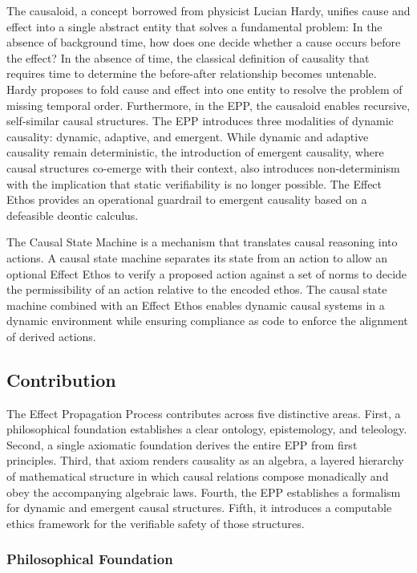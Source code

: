 The causaloid, a concept borrowed from physicist Lucian Hardy, unifies cause and effect into a single abstract entity that solves a fundamental problem: In the absence of background time, how does one decide whether a cause occurs before the effect? In the absence of time, the classical definition of causality that requires time to determine the before-after relationship becomes untenable. Hardy proposes to fold cause and effect into one entity to resolve the problem of missing temporal order. Furthermore, in the EPP, the causaloid enables recursive, self-similar causal structures. The EPP introduces three modalities of dynamic causality: dynamic, adaptive, and emergent. While dynamic and adaptive causality remain deterministic, the introduction of emergent causality, where causal structures co-emerge with their context, also introduces non-determinism with the implication that static verifiability is no longer possible. The Effect Ethos provides an operational guardrail to emergent causality based on a defeasible deontic calculus.

The Causal State Machine is a mechanism that translates causal reasoning into actions. A causal state machine separates its state from an action to allow an optional Effect Ethos to verify a proposed action against a set of norms to decide the permissibility of an action relative to the encoded ethos. The causal state machine combined with an Effect Ethos enables dynamic causal systems in a dynamic environment while ensuring compliance as code to enforce the alignment of derived actions.

\subsection{Contribution}


The Effect Propagation Process contributes across five distinctive areas. First, a philosophical foundation establishes a clear ontology, epistemology, and teleology. Second, a single axiomatic foundation derives the entire EPP from first principles. Third, that axiom renders causality as an algebra, a layered hierarchy of mathematical structure in which causal relations compose monadically and obey the accompanying algebraic laws. Fourth, the EPP establishes a formalism for dynamic and emergent causal structures. Fifth, it introduces a computable ethics framework for the verifiable safety of those structures.

\subsubsection{Philosophical Foundation}

